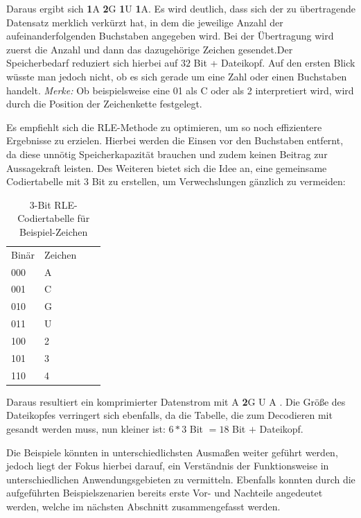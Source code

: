 \documentclass[11pt,a4paper,ngerman]{report}
\begin{document}
		Daraus ergibt sich  \textbf{1}A \textbf{2}G  \textbf{1}U \textbf{1}A. Es wird deutlich, dass sich der zu übertragende Datensatz merklich verkürzt hat, in dem die jeweilige Anzahl der aufeinanderfolgenden Buchstaben angegeben wird. Bei der Übertragung wird zuerst die Anzahl und dann das dazugehörige Zeichen gesendet.Der Speicherbedarf reduziert sich hierbei  auf $32$ Bit + Dateikopf. Auf den ersten Blick wüsste man jedoch nicht, ob es sich gerade um eine Zahl oder einen Buchstaben handelt.  \textit{Merke:} Ob beispielsweise eine 01 als C oder als 2 interpretiert wird, wird durch die Position der Zeichenkette festgelegt. 
			
		Es empfiehlt sich die RLE-Methode zu optimieren, um so noch effizientere Ergebnisse zu erzielen. Hierbei werden die Einsen vor den Buchstaben  entfernt, da diese unnötig Speicherkapazität brauchen und zudem keinen Beitrag zur Aussagekraft leisten. Des Weiteren bietet sich die Idee an, eine gemeinsame Codiertabelle mit 3 Bit zu erstellen, um Verwechslungen gänzlich zu vermeiden:
			
				\begin{table} [H]
				\begin{center}
					\centering
					\begin{tabular}{llll}
						Binär  & Zeichen &  &  \\
						000 & A       &  &  \\
						001 & C          &  &  \\
						010 & G          &  & \\
						011 & U	  & & \\
						100 & 2 & & \\
						101 & 3 & & \\
						110 & 4
						
					\end{tabular}
					\label{CT}		
					\caption{3-Bit RLE-Codiertabelle für Beispiel-Zeichen}
				\end{center}
			\end{table}
		
		Daraus resultiert ein komprimierter Datenstrom mit A \textbf{2}G U A . Die Größe des Dateikopfes verringert sich ebenfalls, da die Tabelle, die zum Decodieren mit gesandt werden muss, nun kleiner  ist: $6 * 3$ Bit $= 18 $ Bit $+$ Dateikopf.
		
		Die Beispiele könnten  in unterschiedlichsten Ausmaßen weiter geführt werden, jedoch liegt der Fokus hierbei darauf, ein Verständnis der Funktionsweise in unterschiedlichen Anwendungsgebieten zu vermitteln. Ebenfalls konnten durch die aufgeführten Beispielszenarien bereits erste Vor- und Nachteile angedeutet werden, welche im nächsten Abschnitt zusammengefasst  werden.
	
\end{document}
